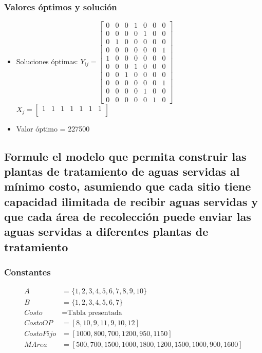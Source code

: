 \documentclass[a4paper,12pt]{article}
\begin{document}
\subsubsection{Valores óptimos y solución}
\begin{itemize}
	\item Soluciones óptimas: $Y_{ij}=
	\begin{bmatrix}
	0 & 0 & 0 & 1 & 0 & 0 & 0\\
	0 & 0 & 0 & 0 & 1 & 0 & 0\\
	0 & 1 & 0 & 0 & 0 & 0 & 0\\
	0 & 0 & 0 & 0 & 0 & 0 & 1\\
	1 & 0 & 0 & 0 & 0 & 0 & 0\\
	0 & 0 & 0 & 1 & 0 & 0 & 0\\
	0 & 0 & 1 & 0 & 0 & 0 & 0\\
	0 & 0 & 0 & 0 & 0 & 0 & 1\\
	0 & 0 & 0 & 0 & 1 & 0 & 0\\
	0 & 0 & 0 & 0 & 0 & 1 & 0
	\end{bmatrix}$
	\\
	$X_{j}=
	\begin{bmatrix}
	1 & 1 & 1 & 1 & 1 & 1 & 1\\
	\end{bmatrix}$
	\item Valor óptimo = 227500
\end{itemize}
\subsection{Formule  el  modelo  que  permita  construir  las  plantas de  tratamiento  de  aguas  servidas  al  mínimo  costo, asumiendo  que  cada  sitio  tiene  capacidad  ilimitada de  recibir  aguas  servidas  y  que  cada  área  de  recolección puede enviar las aguas servidas a diferentes plantas de tratamiento}
\subsubsection{Constantes}
\begin{equation*}
\begin{split}
A&=\{1,2,3,4,5,6,7,8,9,10\}\\
B&=\{1,2,3,4,5,6,7\}\\
Costo &= \text{Tabla presentada}\\
CostoOP&=[8,10,9,11,9,10,12]\\
CostoFijo&=[1000,800,700,1200,950,1150]\\
MArea&=[500,700,1500,1000,1800,1200,1500,1000,900,1600]
\end{split}
\end{equation*}
\end{document}
